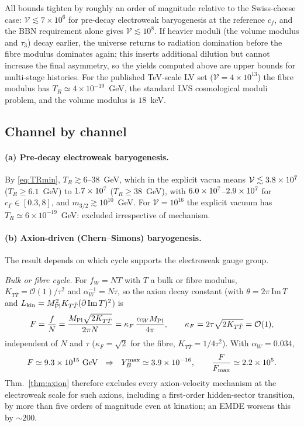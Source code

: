 \documentclass[11pt]{article}
\newcommand{\MP}{M_{\rm Pl}}
\begin{document}
All bounds tighten by roughly an order of magnitude relative to the Swiss-cheese case: $\mathcal V\lesssim7\times10^6$ for pre-decay electroweak baryogenesis at the reference $c_f$, and the BBN requirement alone gives $\mathcal V\lesssim10^8$. If heavier moduli (the volume modulus and $\tau_3$) decay earlier, the universe returns to radiation domination before the fibre modulus dominates again; this inserts additional dilution but cannot increase the final asymmetry, so the yields computed above are upper bounds for multi-stage histories. For the published TeV-scale LV set ($\mathcal V=4\times10^{13}$) the fibre modulus has $T_R\simeq4\times10^{-19}$~GeV, the standard LVS cosmological moduli problem, and the volume modulus is $18$~keV.

\subsection{Channel by channel}
\paragraph{(a) Pre-decay electroweak baryogenesis.} By \eqref{eq:TRmin}, $T_R\gtrsim6$--$38$~GeV, which in the explicit vacua means $\mathcal V\lesssim3.8\times10^{7}$ ($T_R\ge6.1$~GeV) to $1.7\times10^{7}$ ($T_R\ge38$~GeV), with $6.0\times10^{7}$--$2.9\times10^{7}$ for $c_\Gamma\in[0.3,8]$, and $m_{3/2}\gtrsim10^{10}$~GeV. For $\mathcal V=10^{16}$ the explicit vacuum has $T_R\simeq6\times10^{-19}$~GeV: excluded irrespective of mechanism.

\paragraph{(b) Axion-driven (Chern--Simons) baryogenesis.} The result depends on which cycle supports the electroweak gauge group.

\emph{Bulk or fibre cycle.} For $f_W=NT$ with $T$ a bulk or fibre modulus, $K_{T\bar T}=\mathcal O(1)/\tau^2$ and $\alpha_W^{-1}=N\tau$, so the axion decay constant (with $\theta=2\pi\,\mathrm{Im}\,T$ and $L_{\rm kin}=\MP^2K_{T\bar T}(\partial\,\mathrm{Im}\,T)^2$) is
\begin{equation}
F=\frac{f}{N}=\frac{\MP\sqrt{2K_{T\bar T}}}{2\pi N}=\kappa_F\,\frac{\alpha_W\MP}{4\pi},\qquad\kappa_F=2\tau\sqrt{2K_{T\bar T}}=\mathcal O(1),
\end{equation}
independent of $N$ and $\tau$ ($\kappa_F=\sqrt2$ for the fibre, $K_{T\bar T}=1/4\tau^2$). With $\alpha_W=0.034$,
\begin{equation}
F\simeq\fNLVS~\text{GeV}\ \ \Rightarrow\ \ Y_B^{\max}\simeq\Ymaxaxion,\qquad \frac{F}{F_{\max}}\simeq\fNshort.
\end{equation}
Thm.~\ref{thm:axion} therefore excludes every axion-velocity mechanism at the electroweak scale for such axions, including a first-order hidden-sector transition, by more than five orders of magnitude even at kination; an EMDE worsens this by $\sim200$.
\end{document}
